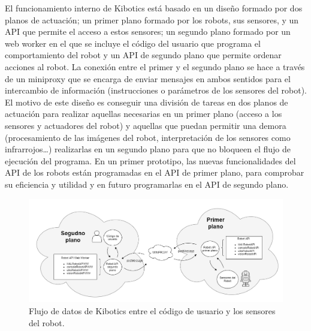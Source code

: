 \documentclass{report}
\begin{document}
El funcionamiento interno de Kibotics está basado en un diseño formado por dos planos de actuación; un primer plano formado por los robots, sus sensores, y un API que permite el acceso a estos sensores; un segundo plano formado por un web worker en el que se incluye el código del usuario que programa el comportamiento del robot y un API de segundo plano que permite ordenar acciones al robot. La conexión entre el primer y el segundo plano se hace a través de un miniproxy que se encarga de enviar mensajes en ambos sentidos para el intercambio de información (instrucciones o parámetros de los sensores del robot). El motivo de este diseño es conseguir una división de tareas en dos planos de actuación para realizar aquellas necesarias en un primer plano (acceso a los sensores y actuadores del robot) y aquellas que puedan permitir una demora (procesamiento de las imágenes del robot, interpretación de los sensores como infrarrojos…) realizarlas en un segundo plano para que no bloqueen el flujo de ejecución del programa. En un primer prototipo, las nuevas funcionalidades del API de los robots están programadas en el API de primer plano, para comprobar su eficiencia y utilidad y en futuro programarlas en el API de segundo plano.

\renewcommand{\figurename}{Figura}		
\begin{figure}[t]
	\centering
	 \includegraphics[scale=0.4]{images/kibotics.png}
	 \caption{Flujo de datos de Kibotics entre el código de usuario y los sensores del robot.}
\end{figure}

\newpage
\end{document}
